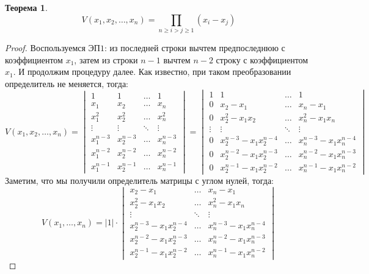 \documentclass[12pt]{article}
\theoremstyle{definition}
\newtheorem{theorem}{Теорема}
\begin{document}
\begin{theorem}
	$$
		V(x_1,x_2,\dotsc,x_n) = \prod\limits_{n \geq i > j \geq 1}(x_i - x_j)
	$$
\end{theorem}
\begin{proof}
	Воспользуемся ЭП$1$: из последней строки вычтем предпоследнюю с коэффициентом $x_1$, затем из строки $n-1$ вычтем $n-2$ строку с коэффициентом $x_1$. И продолжим процедуру далее. Как известно, при таком преобразовании определитель не меняется, тогда:
	$$
		V(x_1,x_2,\dotsc,x_n) = 
		\begin{vmatrix}
			1 & 1 & \dotsc & 1 \\
			x_1 & x_2& \dotsc & x_n\\[4pt]
			x_1^2 & x_2^2 & \dotsc & x_n^2 \\[4pt]
			\vdots & \vdots & \ddots & \vdots \\[4pt]
			x_1^{n-3} & x_2^{n-3} & \dotsc & x_n^{n-3}\\[4pt]
			x_1^{n-2} & x_2^{n-2} & \dotsc & x_n^{n-2}\\[4pt]
			x_1^{n-1} & x_2^{n-1} & \dotsc & x_n^{n-1}
		\end{vmatrix} = 
		\begin{vmatrix}
			1 & 1 & \dotsc & 1 \\ 
			0 & x_2 - x_1& \dotsc & x_n -x_1\\[4pt]
			0 & x_2^2 - x_1 x_2& \dotsc & x_n^2  -x_1 x_n\\[4pt]
			\vdots & \vdots & \ddots & \vdots \\[4pt]
			0 & x_2^{n-3} - x_1x_2^{n-4}& \dotsc & x_n^{n-3} -x_1 x_n^{n-4}\\[4pt]
			0 & x_2^{n-2} - x_1x_2^{n-3}& \dotsc & x_n^{n-2}-x_1 x_n^{n-3}\\[4pt]
			0 & x_2^{n-1} - x_1x_2^{n-2} & \dotsc & x_n^{n-1}-x_1 x_n^{n-2}
		\end{vmatrix}
	$$
	Заметим, что мы получили определитель матрицы с углом нулей, тогда:
	$$
		V(x_1,\dotsc,x_n) = |1|{\cdot}
		\begin{vmatrix}
			x_2 - x_1& \dotsc & x_n -x_1\\[4pt]
			x_2^2 - x_1 x_2& \dotsc & x_n^2  -x_1 x_n\\[4pt]
			\vdots & \ddots & \vdots \\[4pt]
			x_2^{n-3} - x_1x_2^{n-4}& \dotsc & x_n^{n-3} -x_1 x_n^{n-4}\\[4pt]
			x_2^{n-2} - x_1x_2^{n-3}& \dotsc & x_n^{n-2}-x_1 x_n^{n-3}\\[4pt]
			x_2^{n-1} - x_1x_2^{n-2} & \dotsc & x_n^{n-1}-x_1 x_n^{n-2}

\end{vmatrix}$$
\end{proof}
\end{document}
